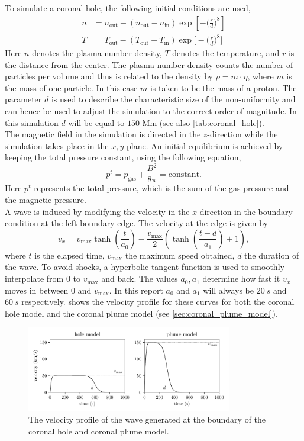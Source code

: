 \documentclass[a4paper]{article}
\numberwithin{figure}{section}
\numberwithin{equation}{section}
\begin{document}
To simulate a coronal hole, the following initial conditions are used,
\begin{align*}
    n &= n_{\text{out}} - (n_{\text{out}}-n_{\text{in}})\exp\left[-\bigg(\frac{r}{d}\bigg)^8\right]\\
    T &= T_{\text{out}} - (T_{\text{out}}-T_{\text{in}})\exp\bigg[-\bigg(\frac{r}{d}\bigg)^8\bigg]
\end{align*}
Here $n$ denotes the plasma number density, $T$ denotes the temperature, and $r$ is the distance from the center. 
The plasma number density counts the number of particles per volume and thus is related to the density by $\rho = m\cdot \eta$, where $m$ is the mass of one particle. In this case $m$ is taken to be the mass of a proton. 
The parameter $d$ is used to describe the characteristic size of the non-uniformity and can hence be used to adjust the simulation to the correct order of magnitude. In this simulation $d$ will be equal to $150$ Mm (see also \cref{tab:coronal_hole}).\\

The magnetic field in the simulation is directed in the $z$-direction while the simulation takes place in the $x,y$-plane. An initial equilibrium is achieved by keeping the total pressure constant, using the following equation,
\begin{equation*}
    p^t = p_{\text{gas}} + \frac{B^2}{8\pi} = \text{constant}.
\end{equation*}
Here $p^t$ represents the total pressure, which is the sum of the gas pressure and the magnetic pressure. \\

A wave is induced by modifying the velocity in the $x$-direction in the boundary condition at the left boundary edge.
The velocity at the edge is given by \[
	v_x = v_\text{max}\tanh\left( \frac{t}{a_0} \right) - \frac{v_\text{max} }{2} \left(\tanh\left( \frac{t-d}{a_1} \right) + 1\right) 
,\]
where $t$ is the elapsed time,  $v_\text{max} $ the maximum speed obtained,  $d$ the duration of the wave. To avoid shocks, a hyperbolic tangent function is used to smoothly interpolate from 0 to $v_\text{max} $ and back. The values $a_0, a_1$ determine how fast it $v_x$ moves in between $0$ and $v_\text{max}$. 
In this report $a_0$ and $a_1$ will always be $\SI{20}{s}$ and $\SI{60}{s}$ respectively.
 shows the velocity profile for these curves for both the coronal hole model and the coronal plume model (see \cref{sec:coronal_plume_model}).
\begin{figure}[h]
	\centering
	\includegraphics[width=0.8\textwidth]{figures/wave_drive}
	\caption{The velocity profile of the wave generated at the boundary of the coronal hole and coronal plume model.}
	\label{fig:wave_drive}
\end{figure}
\end{document}
